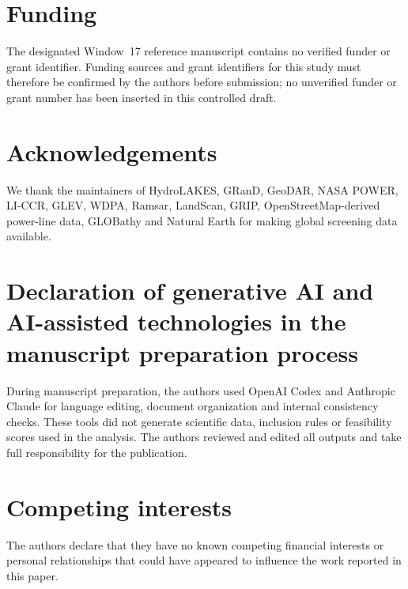 \section*{Funding}
The designated Window~17 reference manuscript contains no verified funder or grant identifier. Funding sources and grant identifiers for this study must therefore be confirmed by the authors before submission; no unverified funder or grant number has been inserted in this controlled draft.

\section*{Acknowledgements}
We thank the maintainers of HydroLAKES, GRanD, GeoDAR, NASA POWER, LI-CCR, GLEV, WDPA, Ramsar, LandScan, GRIP, OpenStreetMap-derived power-line data, GLOBathy and Natural Earth for making global screening data available.

\section*{Declaration of generative AI and AI-assisted technologies in the manuscript preparation process}
During manuscript preparation, the authors used OpenAI Codex and Anthropic Claude for language editing, document organization and internal consistency checks. These tools did not generate scientific data, inclusion rules or feasibility scores used in the analysis. The authors reviewed and edited all outputs and take full responsibility for the publication.

\section*{Competing interests}
The authors declare that they have no known competing financial interests or personal relationships that could have appeared to influence the work reported in this paper.
